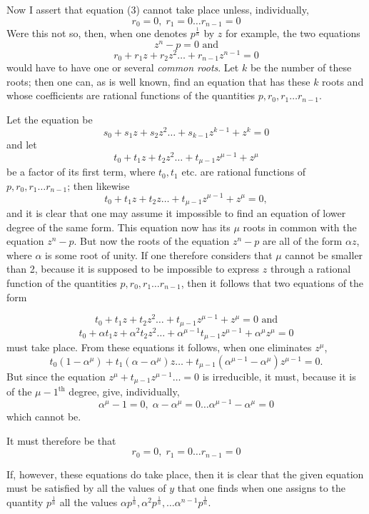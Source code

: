 \documentclass{article}
\begin{document}
Now I assert that equation (3) cannot take place unless, individually,
\[ r_0 = 0, \; r_1 = 0 \ldots r_{n-1} = 0 \]
Were this not so, then, when one denotes $p^{\frac{1}{n}}$ by $z$ for example, the two equations
\[ z^{n} - p = 0 \text{ and} \]
\[ r_0 + r_1 z + r_2 z^{2} \ldots + r_{n-1} z^{n-1} = 0 \]
would have to have one or several \emph{common roots}. Let $k$ be the number of these roots; then one can, as is well known, find an equation that has these $k$ roots and whose coefficients are rational functions of the quantities $p, r_0, r_1 \ldots r_{n-1}$.

Let the equation be
\[ s_0 + s_1 z + s_2 z^{2} \ldots + s_{k-1} z^{k-1} + z^{k} = 0 \]
and let
\[ t_0 + t_1 z + t_2 z^{2} \ldots + t_{\mu-1} z^{\mu-1} + z^{\mu} \]
be a factor of its first term, where $t_0, t_1$ etc. are rational functions of $p, r_0, r_1 \ldots r_{n-1}$; then likewise
\[ t_0 + t_1 z + t_2 z \ldots + t_{\mu-1} z^{\mu-1} + z^{\mu} = 0, \]
and it is clear that one may assume it impossible to find an equation of lower degree of the same form. This equation now has its $\mu$ roots in common with the equation $z^{n} - p$. But now the roots of the equation $z^{n} - p$ are all of the form $\alpha z$, where $\alpha$ is some root of unity. If one therefore considers that $\mu$ cannot be smaller than 2, because it is supposed to be impossible to express $z$ through a rational function of the quantities $p, r_0, r_1 \ldots r_{n-1}$, then it follows that two equations of the form

\[ t_0 + t_1 z + t_2 z^{2} \ldots + t_{\mu-1} z^{\mu-1} + z^{\mu} = 0 \text{ and} \]
\[ t_0 + \alpha t_1 z + \alpha^{2} t_2 z^{2} \ldots + \alpha^{\mu-1} t_{\mu-1} z^{\mu-1} + \alpha^{\mu} z^{\mu} = 0 \]
must take place. From these equations it follows, when one eliminates $z^{\mu}$,
\[ t_0(1 - \alpha^{\mu}) + t_1(\alpha - \alpha^{\mu})z \ldots + t_{\mu-1}(\alpha^{\mu-1} - \alpha^{\mu})z^{\mu-1} = 0. \]
But since the equation $z^{\mu} + t_{\mu-1} z^{\mu-1} \ldots = 0$ is irreducible, it must, because it is of the $\mu - 1^{\text{th}}$ degree, give, individually,
\[ \alpha^{\mu} - 1 = 0, \; \alpha - \alpha^{\mu} = 0 \ldots \alpha^{\mu-1} - \alpha^{\mu} = 0 \]
which cannot be.

It must therefore be that
\[ r_0 = 0, \; r_1 = 0 \ldots r_{n-1} = 0 \]

If, however, these equations do take place, then it is clear that the given equation must be satisfied by all the values of $y$ that one finds when one assigns to the quantity $p^{\frac{1}{n}}$ all the values $\alpha p^{\frac{1}{n}}, \alpha^{2} p^{\frac{1}{n}}, \ldots \alpha^{n-1} p^{\frac{1}{n}}$.
\end{document}
